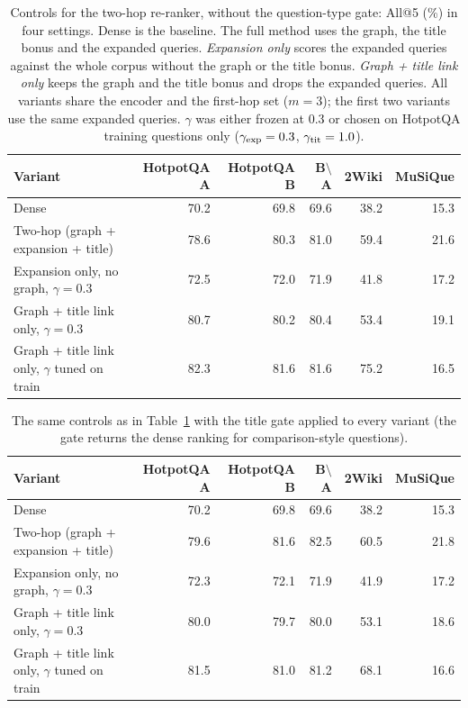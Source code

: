 \begin{table}[t]
\centering
\footnotesize
\caption{Controls for the two-hop re-ranker, without the question-type gate: All@5 (\%) in four settings. Dense is the baseline. The full method uses the graph, the title bonus and the expanded queries. \emph{Expansion only} scores the expanded queries against the whole corpus without the graph or the title bonus. \emph{Graph + title link only} keeps the graph and the title bonus and drops the expanded queries. All variants share the encoder and the first-hop set ($m=3$); the first two variants use the same expanded queries. $\gamma$ was either frozen at 0.3 or chosen on HotpotQA training questions only ($\gamma_{\mathrm{exp}}=0.3$, $\gamma_{\mathrm{tit}}=1.0$).}
\label{tab:controls}
\begin{tabular}{lrrrrr}
\toprule
Variant & HotpotQA A & HotpotQA B & B$\setminus$A & 2Wiki & MuSiQue \\
\midrule
Dense & 70.2 & 69.8 & 69.6 & 38.2 & 15.3 \\
Two-hop (graph + expansion + title) & 78.6 & 80.3 & 81.0 & 59.4 & 21.6 \\
Expansion only, no graph, $\gamma=0.3$ & 72.5 & 72.0 & 71.9 & 41.8 & 17.2 \\
Graph + title link only, $\gamma=0.3$ & 80.7 & 80.2 & 80.4 & 53.4 & 19.1 \\
Graph + title link only, $\gamma$ tuned on train & 82.3 & 81.6 & 81.6 & 75.2 & 16.5 \\
\bottomrule
\end{tabular}
\end{table}
\begin{table}[t]
\centering
\footnotesize
\caption{The same controls as in Table~\ref{tab:controls} with the title gate applied to every variant (the gate returns the dense ranking for comparison-style questions).}
\label{tab:controlsgate}
\begin{tabular}{lrrrrr}
\toprule
Variant & HotpotQA A & HotpotQA B & B$\setminus$A & 2Wiki & MuSiQue \\
\midrule
Dense & 70.2 & 69.8 & 69.6 & 38.2 & 15.3 \\
Two-hop (graph + expansion + title) & 79.6 & 81.6 & 82.5 & 60.5 & 21.8 \\
Expansion only, no graph, $\gamma=0.3$ & 72.3 & 72.1 & 71.9 & 41.9 & 17.2 \\
Graph + title link only, $\gamma=0.3$ & 80.0 & 79.7 & 80.0 & 53.1 & 18.6 \\
Graph + title link only, $\gamma$ tuned on train & 81.5 & 81.0 & 81.2 & 68.1 & 16.6 \\
\bottomrule
\end{tabular}
\end{table}
